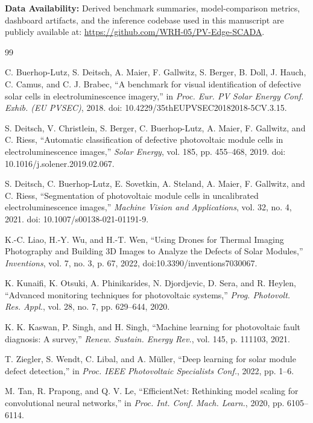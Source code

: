 \documentclass[journal]{IEEEtran}
\begin{document}
\textbf{Data Availability:} Derived benchmark summaries, model-comparison metrics, dashboard artifacts, and the inference codebase used in this manuscript are publicly available at: \url{https://github.com/WRH-05/PV-Edge-SCADA}.

\begin{thebibliography}{99}

 C. Buerhop-Lutz, S. Deitsch, A. Maier, F. Gallwitz, S. Berger, B. Doll, J. Hauch, C. Camus, and C. J. Brabec, ``A benchmark for visual identification of defective solar cells in electroluminescence imagery,'' in \emph{Proc. Eur. PV Solar Energy Conf. Exhib. (EU PVSEC)}, 2018. doi: 10.4229/35thEUPVSEC20182018-5CV.3.15.

 S. Deitsch, V. Christlein, S. Berger, C. Buerhop-Lutz, A. Maier, F. Gallwitz, and C. Riess, ``Automatic classification of defective photovoltaic module cells in electroluminescence images,'' \emph{Solar Energy}, vol. 185, pp. 455--468, 2019. doi: 10.1016/j.solener.2019.02.067.

 S. Deitsch, C. Buerhop-Lutz, E. Sovetkin, A. Steland, A. Maier, F. Gallwitz, and C. Riess, ``Segmentation of photovoltaic module cells in uncalibrated electroluminescence images,'' \emph{Machine Vision and Applications}, vol. 32, no. 4, 2021. doi: 10.1007/s00138-021-01191-9.

 K.-C. Liao, H.-Y. Wu, and H.-T. Wen, ``Using Drones for Thermal Imaging Photography and Building 3D Images to Analyze the Defects of Solar Modules,'' \emph{Inventions}, vol. 7, no. 3, p. 67, 2022, doi:10.3390/inventions7030067.

 K. Kunaifi, K. Otsuki, A. Phinikarides, N. Djordjevic, D. Sera, and R. Heylen, ``Advanced monitoring techniques for photovoltaic systems,'' \emph{Prog. Photovolt. Res. Appl.}, vol. 28, no. 7, pp. 629--644, 2020.

 K. K. Kaswan, P. Singh, and H. Singh, ``Machine learning for photovoltaic fault diagnosis: A survey,'' \emph{Renew. Sustain. Energy Rev.}, vol. 145, p. 111103, 2021.

 T. Ziegler, S. Wendt, C. Libal, and A. M\"uller, ``Deep learning for solar module defect detection,'' in \emph{Proc. IEEE Photovoltaic Specialists Conf.}, 2022, pp. 1--6.

 M. Tan, R. Prapong, and Q. V. Le, ``EfficientNet: Rethinking model scaling for convolutional neural networks,'' in \emph{Proc. Int. Conf. Mach. Learn.}, 2020, pp. 6105--6114.


\end{thebibliography}
\end{document}

